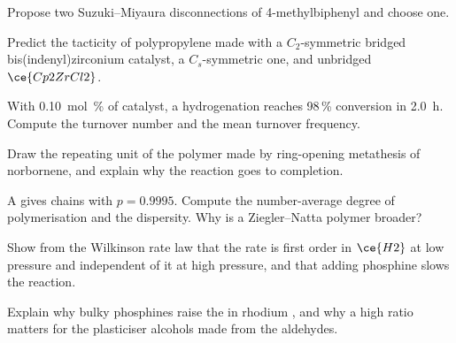 \begin{exercise}[$\star\star$]\label{exo:b3:homogeneous-catalysis:6}
Propose two Suzuki--Miyaura disconnections of 4-methylbiphenyl and choose one.
\end{exercise}

\begin{exercise}[$\star\star$]\label{exo:b3:homogeneous-catalysis:7}
Predict the tacticity of polypropylene made with a $C_2$-symmetric bridged
bis(indenyl)zirconium catalyst, a $C_s$-symmetric one, and unbridged $\ce{Cp2ZrCl2}$.
\end{exercise}

\begin{exercise}[$\star\star$]\label{exo:b3:homogeneous-catalysis:8}
With \qty{0.10}{mol\%} of catalyst, a hydrogenation reaches 98\,\% conversion in \qty{2.0}{h}.
Compute the turnover number and the mean turnover frequency.
\end{exercise}

\begin{exercise}[$\star\star$]\label{exo:b3:homogeneous-catalysis:9}
Draw the repeating unit of the polymer made by ring-opening metathesis of
norbornene, and explain why the reaction goes to completion.
\end{exercise}

\begin{exercise}[$\star\star\star$]\label{exo:b3:homogeneous-catalysis:10}
A  gives chains with $p = 0.9995$. Compute the number-average
degree of polymerisation and the dispersity. Why is a Ziegler--Natta polymer
broader?
\end{exercise}

\begin{exercise}[$\star\star\star$]\label{exo:b3:homogeneous-catalysis:11}
Show from the Wilkinson rate law that the rate is first order in $\ce{H2}$ at low pressure
and independent of it at high pressure, and that adding phosphine slows the
reaction.
\end{exercise}

\begin{exercise}[$\star\star\star$]\label{exo:b3:homogeneous-catalysis:12}
Explain why bulky phosphines raise the  in rhodium
, and why a high ratio matters for the plasticiser alcohols made
from the aldehydes.
\end{exercise}

